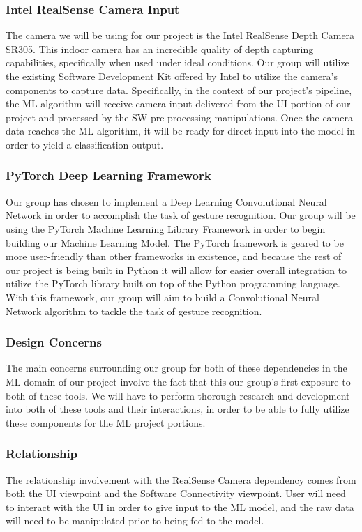 \documentclass[onecolumn, draftclsnofoot,10pt, compsoc]{IEEEtran}
\begin{document}
\subsubsection{Intel RealSense Camera Input}
The camera we will be using for our project is the Intel RealSense Depth Camera SR305. This indoor camera has an incredible quality of depth capturing capabilities, specifically when used under ideal conditions. Our group will utilize the existing Software Development Kit offered by Intel to utilize the camera's components to capture data. Specifically, in the context of our project's pipeline, the ML algorithm will receive camera input delivered from the UI portion of our project and processed by the SW pre-processing manipulations. Once the camera data reaches the ML algorithm, it will be ready for direct input into the model in order to yield a classification output. 
\subsubsection{PyTorch Deep Learning Framework}
Our group has chosen to implement a Deep Learning Convolutional Neural Network in order to accomplish the task of gesture recognition. Our group will be using the PyTorch Machine Learning Library Framework in order to begin building our Machine Learning Model. The PyTorch framework is geared to be more user-friendly than other frameworks in existence, and because the rest of our project is being built in Python it will allow for easier overall integration to utilize the PyTorch library built on top of the Python programming language. With this framework, our group will aim to build a Convolutional Neural Network algorithm to tackle the task of gesture recognition.
\subsubsection{Design Concerns}
The main concerns surrounding our group for both of these dependencies in the ML domain of our project involve the fact that this our group's first exposure to both of these tools. We will have to perform thorough research and development into both of these tools and their interactions, in order to be able to fully utilize these components for the ML project portions.
\subsubsection{Relationship}
The relationship involvement with the RealSense Camera dependency comes from both the UI viewpoint and the Software Connectivity viewpoint. User will need to interact with the UI in order to give input to the ML model, and the raw data will need to be manipulated prior to being fed to the model.
\end{document}
